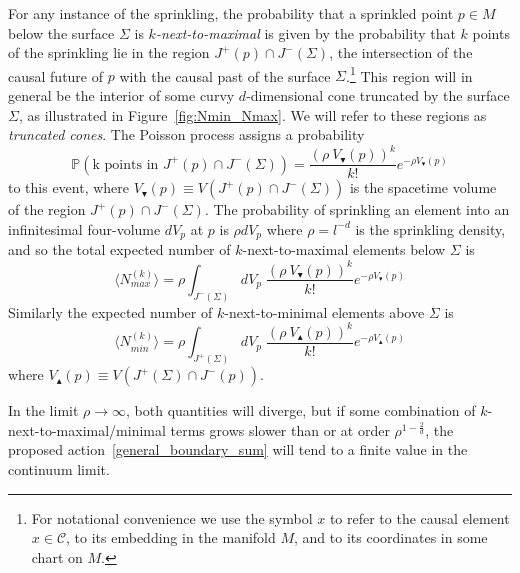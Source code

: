\documentclass[12pt]{article}
\newcommand{\be}{\begin{equation}}
\newcommand{\ee}{\end{equation}}
\begin{document}
For any instance of the sprinkling, the probability that a sprinkled point $p\in M$ below the surface $\Sigma$ is $k$\emph{-next-to-maximal} is given by the probability that $k$ points of the sprinkling lie in the region $J^{+}(p)\cap J^{-}(\Sigma)$, the intersection of the causal future of $p$ with the causal past of the surface $\Sigma$.\footnote{For notational convenience we use the symbol $x$ to refer to the causal element $x\in\mathcal C$, to its embedding in the manifold $M$, and to its coordinates in some chart on $M$.} This region will in general be the interior of some curvy $d$-dimensional cone truncated by the surface $\Sigma$, as illustrated in Figure~\ref{fig:Nmin_Nmax}. We will refer to these regions as \emph{truncated cones}. The Poisson process assigns a probability
\be\label{Poisson}
\mathbb P\left(\text{k points in }J^{+}(p)\cap J^{-}(\Sigma)\right)=\frac{\left(\rho\: V_\blacktriangledown(p)\right)^k}{k!}e^{-\rho V_\blacktriangledown(p)}
\ee
to this event, where $V_\blacktriangledown(p)\equiv V(J^{+}(p)\cap J^{-}(\Sigma))$ is the spacetime volume of the region $J^{+}(p)\cap J^{-}(\Sigma)$. The probability of sprinkling an element into an infinitesimal four-volume $dV_p$ at $p$ is $\rho dV_p$ where $\rho=l^{-d}$ is the sprinkling density, and so the total expected number of $k$-next-to-maximal elements below $\Sigma$ is
\be\label{eq:nmax}
\langle N_{max}^{(k)}\rangle =\rho\int_{J^{-}(\Sigma)}dV_p\; \frac{\left(\rho\: V_\blacktriangledown(p)\right)^k}{k!}e^{-\rho V_\blacktriangledown(p)}
\ee
Similarly the expected number of $k$-next-to-minimal elements above $\Sigma$ is
\be\label{eq:nmin}
\langle N_{min}^{(k)}\rangle =\rho\int_{J^{+}(\Sigma)}dV_p\; \frac{\left(\rho\: V_\blacktriangle(p)\right)^k}{k!}e^{-\rho V_\blacktriangle(p)}
\ee
where $V_\blacktriangle(p)\equiv V(J^{+}(\Sigma)\cap J^{-}(p))$.

In the limit $\rho\rightarrow\infty$, both quantities will diverge, but if some combination of $k$-next-to-maximal/minimal terms grows slower than or at order $\rho^{1-\frac2d}$, the proposed action~\eqref{general_boundary_sum} will tend to a finite value in the continuum limit.
\end{document}
